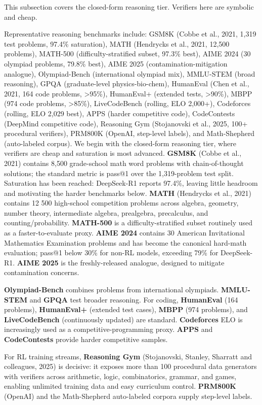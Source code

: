 This subsection covers the closed-form reasoning tier. Verifiers here are symbolic and cheap.

Representative reasoning benchmarks include: GSM8K (Cobbe et al., 2021, 1,319 test problems, 97.4\% saturation), MATH (Hendrycks et al., 2021, 12,500 problems), MATH-500 (difficulty-stratified subset, 97.3\% best), AIME 2024 (30 olympiad problems, 79.8\% best), AIME 2025 (contamination-mitigation analogue), Olympiad-Bench (international olympiad mix), MMLU-STEM (broad reasoning), GPQA (graduate-level physics-bio-chem), HumanEval (Chen et al., 2021, 164 code problems, \textgreater95\%), HumanEval+ (extended tests, \textgreater90\%), MBPP (974 code problems, \textgreater85\%), LiveCodeBench (rolling, ELO 2,000+), Codeforces (rolling, ELO 2,029 best), APPS (harder competitive code), CodeContests (DeepMind competitive code), Reasoning Gym (Stojanovski et al., 2025, 100+ procedural verifiers), PRM800K (OpenAI, step-level labels), and Math-Shepherd (auto-labeled corpus). We begin with the closed-form reasoning tier, where verifiers are cheap and saturation is most advanced. \textbf{GSM8K} (Cobbe et al., 2021) contains 8,500 grade-school math word problems with chain-of-thought solutions; the standard metric is pass@1 over the 1,319-problem test split. Saturation has been reached: DeepSeek-R1 reports 97.4\%, leaving little headroom and motivating the harder benchmarks below. \textbf{MATH} (Hendrycks et al., 2021) contains 12 500 high-school competition problems across algebra, geometry, number theory, intermediate algebra, prealgebra, precalculus, and counting/probability. \textbf{MATH-500} is a difficulty-stratified subset routinely used as a faster-to-evaluate proxy. \textbf{AIME 2024} contains 30 American Invitational Mathematics Examination problems and has become the canonical hard-math evaluation; pass@1 below 30\% for non-RL models, exceeding 79\% for DeepSeek-R1. \textbf{AIME 2025} is the freshly-released analogue, designed to mitigate contamination concerns.

\textbf{Olympiad-Bench} combines problems from international olympiads. \textbf{MMLU-STEM} and \textbf{GPQA} test broader reasoning. For coding, \textbf{HumanEval} (164 problems), \textbf{HumanEval+} (extended test cases), \textbf{MBPP} (974 problems), and \textbf{LiveCodeBench} (continuously updated) are standard. \textbf{Codeforces} ELO is increasingly used as a competitive-programming proxy. \textbf{APPS} and \textbf{CodeContests} provide harder competitive samples.

For RL training streams, \textbf{Reasoning Gym} (Stojanovski, Stanley, Sharratt and colleagues, 2025) is decisive: it exposes more than 100 procedural data generators with verifiers across arithmetic, logic, combinatorics, grammar, and games, enabling unlimited training data and easy curriculum control. \textbf{PRM800K} (OpenAI) and the Math-Shepherd auto-labeled corpora supply step-level labels.

